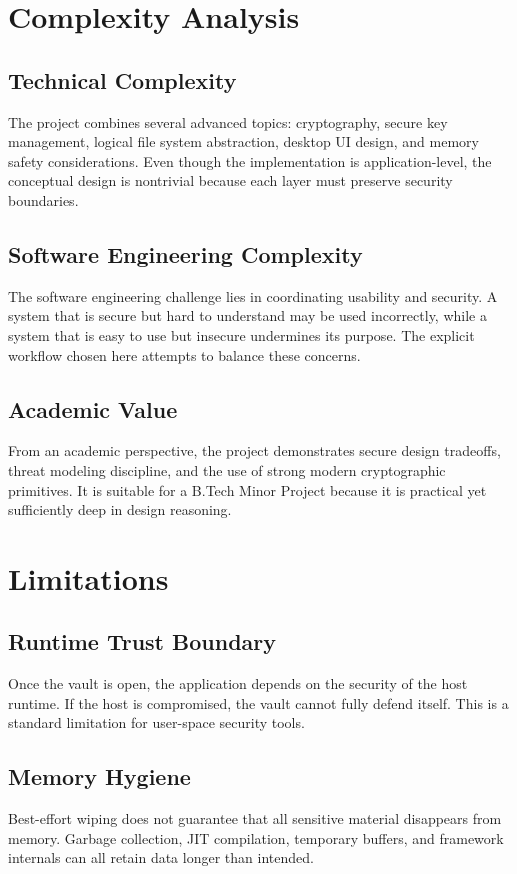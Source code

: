 \documentclass[12pt,a4paper]{report}
\begin{document}
\chapter{Complexity Analysis}
\section{Technical Complexity}
The project combines several advanced topics: cryptography, secure key management, logical file system abstraction, desktop UI design, and memory safety considerations. Even though the implementation is application-level, the conceptual design is nontrivial because each layer must preserve security boundaries.

\section{Software Engineering Complexity}
The software engineering challenge lies in coordinating usability and security. A system that is secure but hard to understand may be used incorrectly, while a system that is easy to use but insecure undermines its purpose. The explicit workflow chosen here attempts to balance these concerns.

\section{Academic Value}
From an academic perspective, the project demonstrates secure design tradeoffs, threat modeling discipline, and the use of strong modern cryptographic primitives. It is suitable for a B.Tech Minor Project because it is practical yet sufficiently deep in design reasoning.

\chapter{Limitations}
\section{Runtime Trust Boundary}
Once the vault is open, the application depends on the security of the host runtime. If the host is compromised, the vault cannot fully defend itself. This is a standard limitation for user-space security tools.

\section{Memory Hygiene}
Best-effort wiping does not guarantee that all sensitive material disappears from memory. Garbage collection, JIT compilation, temporary buffers, and framework internals can all retain data longer than intended.
\end{document}
